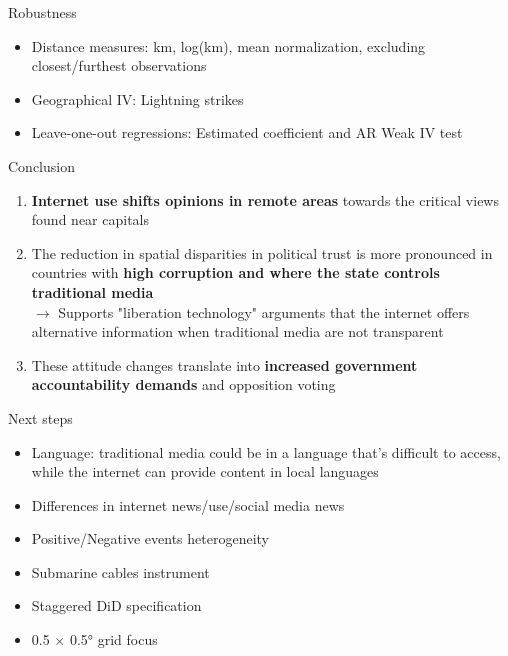 \documentclass[aspectratio=169,xcolor=dvipsnames]{beamer}
\begin{document}
\begin{frame}{Robustness}
\begin{itemize}
    \item Distance measures: km, log(km), mean normalization, excluding closest/furthest observations
    \vfill
    \item Geographical IV: Lightning strikes
    \vfill
    \item Leave-one-out regressions: Estimated coefficient and AR Weak IV test
\end{itemize}
    

\end{frame}

\begin{frame}{Conclusion}
    \begin{enumerate}
        \item \textcolor[RGB]{220, 10, 10}{\textbf{Internet use shifts opinions in remote areas}} towards the critical views found near capitals
        \vfill
        \item The reduction in spatial disparities in political trust is more pronounced in countries with \textcolor[RGB]{220, 10, 10}{\textbf{high corruption and where the state controls traditional media}}\\
        \vfill
        $\rightarrow$ Supports "liberation technology" arguments that the internet offers alternative information when traditional media are not transparent
        \vfill
        \item These attitude changes translate into \textcolor[RGB]{220, 10, 10}{\textbf{increased government accountability demands}} and opposition voting
    \end{enumerate}
\end{frame}

\begin{frame}{Next steps}
    \begin{itemize}
        \item Language: traditional media could be in a language that's difficult to access, while the internet can provide content in local languages
        \vfill
        \item Differences in internet news/use/social media news
        \vfill
        \item Positive/Negative events heterogeneity
        \vfill
        \item Submarine cables instrument
        \vfill
        \item Staggered DiD specification
        \vfill
        \item 0.5 $\times$ 0.5° grid focus
        \vfill
    \end{itemize}
\end{frame}
\end{document}
